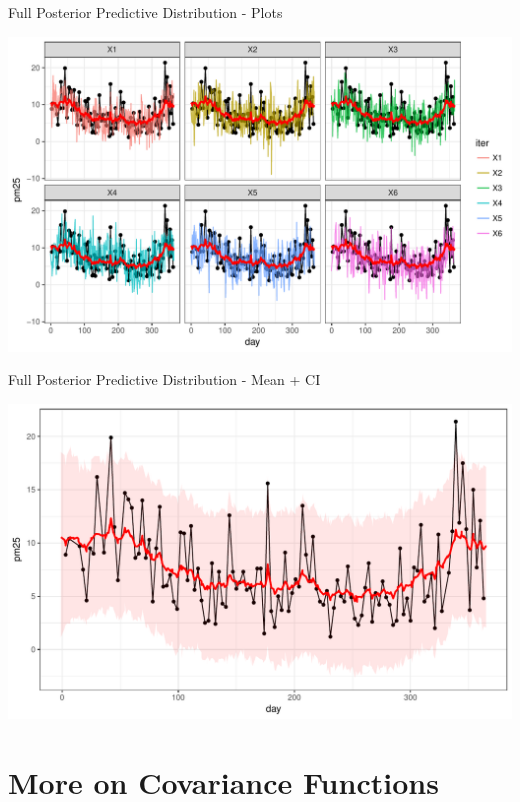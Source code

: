 \documentclass[11pt,ignorenonframetext,]{beamer}
\begin{document}
\begin{frame}{Full Posterior Predictive Distribution - Plots}

\includegraphics{Lec14_files/figure-beamer/unnamed-chunk-7-1.pdf}

\end{frame}

\begin{frame}{Full Posterior Predictive Distribution - Mean + CI}

\includegraphics{Lec14_files/figure-beamer/unnamed-chunk-8-1.pdf}

\end{frame}

\section{More on Covariance
Functions}\label{more-on-covariance-functions}
\end{document}
